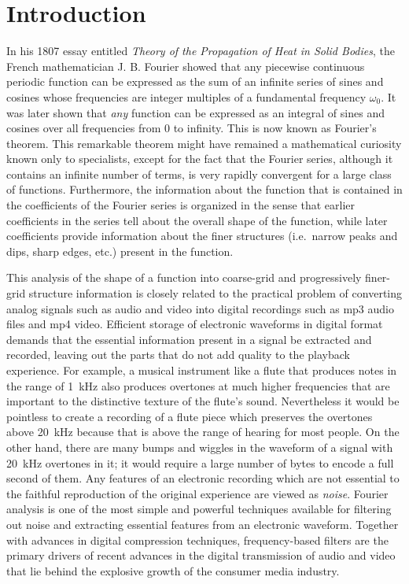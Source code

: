 \documentclass{revtex4}
\begin{document}
\section{Introduction}

In his 1807 essay entitled {\em Theory of the Propagation of Heat in Solid
Bodies}, the French mathematician J. B. Fourier showed that any piecewise
continuous periodic function can be expressed as the sum of an infinite series
of sines and cosines whose frequencies are integer multiples of a fundamental
frequency $\omega_0$. It was later shown that {\em any} function can be
expressed as an integral of sines and cosines over all frequencies from 0 to
infinity.  This is now known as Fourier's theorem.  This remarkable theorem
might have remained a mathematical curiosity known only to specialists,
except for the fact that the Fourier series, although it contains an infinite
number of terms, is very rapidly convergent for a large class of functions.
Furthermore, the information about the function that is contained in the
coefficients of the Fourier series is organized in the sense that earlier
coefficients in the series tell about the overall shape of the function,
while later coefficients provide information about the finer structures
(i.e.\ narrow peaks and dips, sharp edges, etc.) present in the function.

This analysis of the shape of a function into coarse-grid and progressively
finer-grid structure information is closely related to the practical
problem of converting analog signals such as audio and video into digital
recordings such as mp3 audio files and mp4 video.  Efficient storage of
electronic waveforms in digital format demands that the essential information
present in a signal be extracted and recorded, leaving out the parts that
do not add quality to the playback experience.  For example, a musical
instrument like a flute that produces notes in the range of 1~kHz also
produces overtones at much higher frequencies that are important to the
distinctive texture of the flute's sound.  Nevertheless it would be
pointless to create a recording of a flute piece which preserves the
overtones above 20~kHz because that is above the range of hearing for
most people.  On the other hand, there are many bumps and wiggles in the
waveform of a signal with 20~kHz overtones in it; it would require a large
number of bytes to encode a full second of them.  Any features of an 
electronic recording which are not essential to the faithful reproduction
of the original experience are viewed as {\em noise}.  Fourier analysis
is one of the most simple and powerful techniques available for filtering
out noise and extracting essential features from an electronic waveform.
Together with advances in digital compression techniques, frequency-based
filters are the primary drivers of recent advances in the digital
transmission of audio and video that lie behind the explosive growth
of the consumer media industry.
\end{document}
